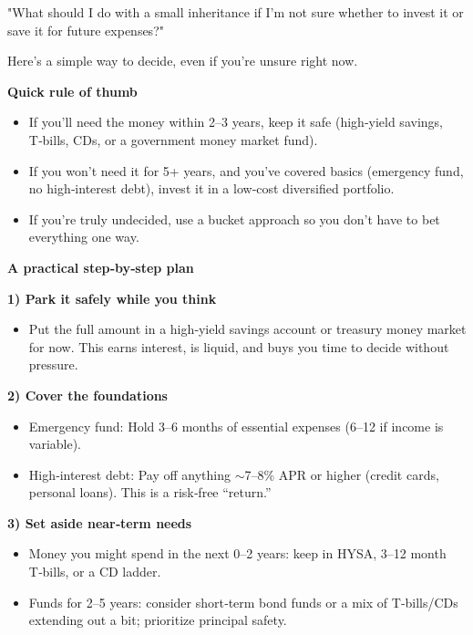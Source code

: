 \begin{promptbox}
"What should I do with a small inheritance if I'm not sure whether to invest it or save it for future expenses?"
\end{promptbox}
\vspace{1cm}

\begin{responsebox}
Here’s a simple way to decide, even if you’re unsure right now.

\textbf{Quick rule of thumb}
\begin{itemize}[noitemsep, topsep=0pt]
    \item If you’ll need the money within 2–3 years, keep it safe (high‑yield savings, T‑bills, CDs, or a government money market fund).
    \item If you won’t need it for 5+ years, and you’ve covered basics (emergency fund, no high‑interest debt), invest it in a low‑cost diversified portfolio.
    \item If you’re truly undecided, use a bucket approach so you don’t have to bet everything one way.
\end{itemize}

\textbf{A practical step‑by‑step plan}

\textbf{1) Park it safely while you think}
\begin{itemize}[noitemsep, topsep=0pt]
    \item Put the full amount in a high‑yield savings account or treasury money market for now. This earns interest, is liquid, and buys you time to decide without pressure.
\end{itemize}

\textbf{2) Cover the foundations}
\begin{itemize}[noitemsep, topsep=0pt]
    \item Emergency fund: Hold 3–6 months of essential expenses (6–12 if income is variable).
    \item High‑interest debt: Pay off anything $\sim$7–8\% APR or higher (credit cards, personal loans). This is a risk‑free “return.”
\end{itemize}

\textbf{3) Set aside near‑term needs}
\begin{itemize}[noitemsep, topsep=0pt]
    \item Money you might spend in the next 0–2 years: keep in HYSA, 3–12 month T‑bills, or a CD ladder.
    \item Funds for 2–5 years: consider short‑term bond funds or a mix of T‑bills/CDs extending out a bit; prioritize principal safety.
\end{itemize}


\end{responsebox}
